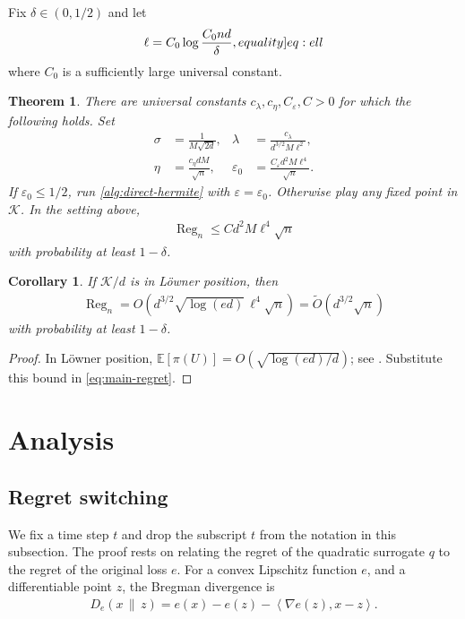 \documentclass[11pt]{article}
\newtheorem{theorem}{Theorem}
\newtheorem{corollary}[corollary]{Corollary}
\newcommand{\eqlabel}[1]{\label[equality]{#1}}
\newcommand{\E}{\mathbb E}
\newcommand{\K}{\mathcal K}
\newcommand{\1}{\mathbf 1}
\newcommand{\eps}{\varepsilon}
\newcommand{\ip}[2]{\left\langle #1,#2\right\rangle}
\begin{document}
Fix $\delta\in(0,1/2)$ and let
\begin{align}
    \ell=C_0\log\frac{C_0nd}{\delta},
    \eqlabel{eq:ell}
\end{align}
where $C_0$ is a sufficiently large universal constant.

\begin{theorem}
    \label{thm:main}
    There are universal constants $c_\lambda,c_\eta,C_\eps,C>0$ for which the
    following holds.  Set
    \begin{align}
        \sigma  & =\frac1{M\sqrt{2d}},
                &
        \lambda & =\frac{c_\lambda}{d^{3/2}M\ell^2},
        \label{eq:parameters-one}                     \\
        \eta    & =\frac{c_\eta dM}{\sqrt n},
                &
        \eps_0  & =\frac{C_\eps d^2M\ell^4}{\sqrt n}.
        \label{eq:parameters-two}
    \end{align}
    If $\eps_0\leq1/2$, run \cref{alg:direct-hermite} with $\eps=\eps_0$.
    Otherwise play any fixed point in $\K$.  In the setting above,
    \begin{align}
        \operatorname{Reg}_n
        \leq C d^2M\ell^4\sqrt n
        \label{eq:main-regret}
    \end{align}
    with probability at least $1-\delta$.
\end{theorem}

\begin{corollary}
    \label{cor:loewner}
    If $\K/d$ is in L\"owner position, then
    \begin{align}
        \operatorname{Reg}_n
        =O\!\left(
        d^{3/2}\sqrt{\log(ed)}\,\ell^4\sqrt n
        \right)
        =\widetilde O(d^{3/2}\sqrt n)
    \end{align}
    with probability at least $1-\delta$.
\end{corollary}

\begin{proof}
    In L\"owner position,
    $\E[\pi(U)]=O(\sqrt{\log(ed)/d})$; see
    \citet[Table~10.1(a)]{lattimore2026bandit}.  Substitute this bound in
    \eqref{eq:main-regret}.
\end{proof}

\section{Analysis}
\label{sec:analysis}
\subsection{Regret switching}
We fix a time step $t$ and drop the subscript $t$ from the notation in this subsection.
The proof rests on relating the regret of the quadratic surrogate $q$ to the regret of the original loss $e$.
For a convex Lipschitz function $e$, and a differentiable point $z$, the Bregman divergence is
\begin{align}
    D_e(x\,\|\,z)
    =e(x)-e(z)-\ip{\nabla e(z)}{x-z}.
    \label{eq:bregman}
\end{align}
\end{document}
